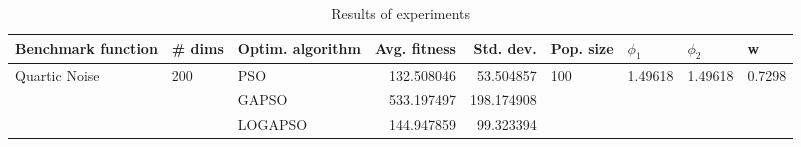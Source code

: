 \begin{table}
\centering
\caption{Results of experiments}
\begin{tabular}{lllrrllll}
\toprule
            Benchmark function &              \# dims & Optim. algorithm &  Avg. fitness &  Std. dev. &            Pop. size &               $\phi_{1}$ &               $\phi_{2}$ &                       w \\
\midrule
\multirow{3}{*}{Quartic Noise} & \multirow{3}{*}{200} &              PSO &    132.508046 &  53.504857 & \multirow{3}{*}{100} & \multirow{3}{*}{1.49618} & \multirow{3}{*}{1.49618} & \multirow{3}{*}{0.7298} \\
                               &                      &            GAPSO &    533.197497 & 198.174908 &                      &                          &                          &                         \\
                               &                      &          LOGAPSO &    144.947859 &  99.323394 &                      &                          &                          &                         \\
\bottomrule
\end{tabular}
\end{table}
